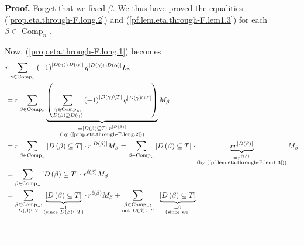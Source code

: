 \documentclass[numbers=enddot,12pt,final,onecolumn,notitlepage]{scrartcl}%
\theoremstyle{definition}
\newenvironment{proof}[1][Proof]{\noindent\textbf{#1.} }{\ \rule{0.5em}{0.5em}}
\let\sumnonlimits\sum
\renewcommand{\sum}{\sumnonlimits\limits}
\newenvironment{verlong}{}{}
\begin{document}
\begin{verlong}
\begin{proof}
Forget that we fixed $\beta$. We thus have proved the equalities
(\ref{prop.eta.through-F.long.2}) and (\ref{pf.lem.eta.through-F.lem1.3}) for
each $\beta\in\operatorname*{Comp}\nolimits_{n}$.

Now, (\ref{prop.eta.through-F.long.1}) becomes%
\begin{align*}
&  r\sum_{\gamma\in\operatorname*{Comp}\nolimits_{n}}\left(  -1\right)
^{\left\vert D\left(  \gamma\right)  \setminus D\left(  \alpha\right)
\right\vert }q^{\left\vert D\left(  \gamma\right)  \cap D\left(
\alpha\right)  \right\vert }L_{\gamma}\\
&  =r\sum_{\beta\in\operatorname*{Comp}\nolimits_{n}}\underbrace{\left(
\sum_{\substack{\gamma\in\operatorname*{Comp}\nolimits_{n};\\D\left(
\beta\right)  \supseteq D\left(  \gamma\right)  }}\left(  -1\right)
^{\left\vert D\left(  \gamma\right)  \setminus T\right\vert }q^{\left\vert
D\left(  \gamma\right)  \cap T\right\vert }\right)  }_{\substack{=\left[
D\left(  \beta\right)  \subseteq T\right]  \cdot r^{\left\vert D\left(
\beta\right)  \right\vert }\\\text{(by (\ref{prop.eta.through-F.long.2}))}%
}}M_{\beta}\\
&  =r\sum_{\beta\in\operatorname*{Comp}\nolimits_{n}}\left[  D\left(
\beta\right)  \subseteq T\right]  \cdot r^{\left\vert D\left(  \beta\right)
\right\vert }M_{\beta}=\sum_{\beta\in\operatorname*{Comp}\nolimits_{n}}\left[
D\left(  \beta\right)  \subseteq T\right]  \cdot\underbrace{rr^{\left\vert
D\left(  \beta\right)  \right\vert }}_{\substack{=r^{\ell\left(  \beta\right)
}\\\text{(by (\ref{pf.lem.eta.through-F.lem1.3}))}}}M_{\beta}\\
&  =\sum_{\beta\in\operatorname*{Comp}\nolimits_{n}}\left[  D\left(
\beta\right)  \subseteq T\right]  \cdot r^{\ell\left(  \beta\right)  }%
M_{\beta}\\
&  =\sum_{\substack{\beta\in\operatorname*{Comp}\nolimits_{n};\\D\left(
\beta\right)  \subseteq T}}\underbrace{\left[  D\left(  \beta\right)
\subseteq T\right]  }_{\substack{=1\\\text{(since }D\left(  \beta\right)
\subseteq T\text{)}}}\cdot\,r^{\ell\left(  \beta\right)  }M_{\beta}%
+\sum_{\substack{\beta\in\operatorname*{Comp}\nolimits_{n};\\\text{not
}D\left(  \beta\right)  \subseteq T}}\ \ \underbrace{\left[  D\left(
\beta\right)  \subseteq T\right]  }_{\substack{=0\\\text{(since we
}}}
\end{align*}
\end{proof}
\end{verlong}
\end{document}
